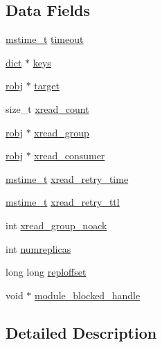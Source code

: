 \subsection*{Data Fields}
\begin{DoxyCompactItemize}
\item 
\hyperlink{redismodule_8h_a652ae61e2475bc8957454534544968fc}{mstime\+\_\+t} \hyperlink{structblocking_state_a1adf524d2a0c7f9eb77f4f78e6c05620}{timeout}
\item 
\hyperlink{structdict}{dict} $\ast$ \hyperlink{structblocking_state_af63a8281ce9a4285e41df3e045e7c91f}{keys}
\item 
\hyperlink{server_8h_a540f174d2685422fbd7d12e3cd44c8e2}{robj} $\ast$ \hyperlink{structblocking_state_acb665c66e7b32809e1371a4bdec1907e}{target}
\item 
size\+\_\+t \hyperlink{structblocking_state_a1158eb78330481cd4b10428513888bf6}{xread\+\_\+count}
\item 
\hyperlink{server_8h_a540f174d2685422fbd7d12e3cd44c8e2}{robj} $\ast$ \hyperlink{structblocking_state_a410020be56fcf2afc10554265f111cf5}{xread\+\_\+group}
\item 
\hyperlink{server_8h_a540f174d2685422fbd7d12e3cd44c8e2}{robj} $\ast$ \hyperlink{structblocking_state_acc7493490f2c56371b38f76c15ed7912}{xread\+\_\+consumer}
\item 
\hyperlink{redismodule_8h_a652ae61e2475bc8957454534544968fc}{mstime\+\_\+t} \hyperlink{structblocking_state_aab944cd8b3460c6e1a73853f47edd379}{xread\+\_\+retry\+\_\+time}
\item 
\hyperlink{redismodule_8h_a652ae61e2475bc8957454534544968fc}{mstime\+\_\+t} \hyperlink{structblocking_state_a7ee5bfe490a220cccc4c44fd5640a2b3}{xread\+\_\+retry\+\_\+ttl}
\item 
int \hyperlink{structblocking_state_a8ea7b41dabb441998b04529342f97355}{xread\+\_\+group\+\_\+noack}
\item 
int \hyperlink{structblocking_state_a77bbb7714f638a33a511b7c79b05d9bf}{numreplicas}
\item 
long long \hyperlink{structblocking_state_a640179b63c7bf95361949de7cb214d9c}{reploffset}
\item 
void $\ast$ \hyperlink{structblocking_state_a6761112482922feef30b00f99612ad2c}{module\+\_\+blocked\+\_\+handle}
\end{DoxyCompactItemize}


\subsection{Detailed Description}


